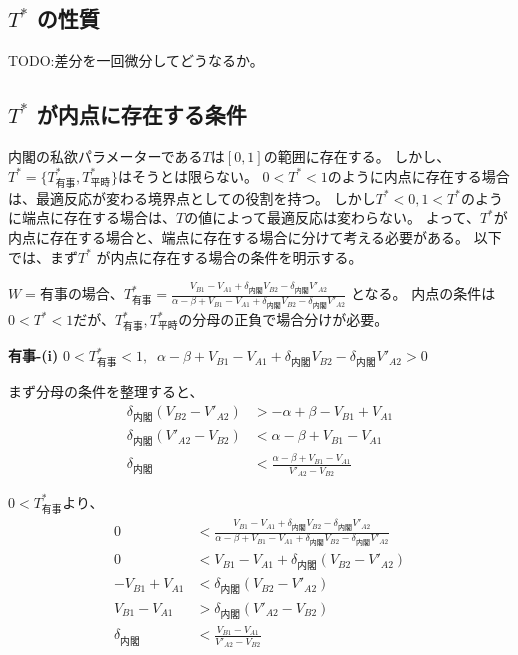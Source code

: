 \documentclass[main.tex]{subfiles}
\begin{document}
\subsection{$T^*$ の性質}

TODO:差分を一回微分してどうなるか。






\subsection{$T^*$ が内点に存在する条件}

内閣の私欲パラメーターである$T$は$[0,1]$の範囲に存在する。
しかし、$T^* = \lbrace T^*_{有事}, T^*_{平時} \rbrace$はそうとは限らない。
$0<T^*<1$のように内点に存在する場合は、最適反応が変わる境界点としての役割を持つ。
しかし$T^*<0,1<T^*$のように端点に存在する場合は、$T$の値によって最適反応は変わらない。
よって、$T^*$が内点に存在する場合と、端点に存在する場合に分けて考える必要がある。
以下では、まず$T^*$ が内点に存在する場合の条件を明示する。


$W=有事$の場合、$T^*_{有事} = \frac{ V_{B1} - V_{A1} +\delta_{内閣}V_{B2} - \delta_{内閣}V'_{A2} }{ \alpha-\beta + V_{B1}-V_{A1} + \delta_{内閣}V_{B2} - \delta_{内閣}V'_{A2} }$
となる。
内点の条件は$0<T^*<1$だが、$T^*_{有事}, T^*_{平時}$の分母の正負で場合分けが必要。

\bigskip
\noindent
\textbf{有事-(i)}\; $0<T^*_{有事}<1,\;\; \alpha-\beta + V_{B1}-V_{A1} + \delta_{内閣}V_{B2} - \delta_{内閣}V'_{A2} > 0$

まず分母の条件を整理すると、
\begin{align*}
    \delta_{内閣}(V_{B2} - V'_{A2}) &> -\alpha+\beta - V_{B1}+V_{A1} \\
    \delta_{内閣}(V'_{A2} - V_{B2}) &< \alpha-\beta + V_{B1}-V_{A1}\\
    \delta_{内閣} &< \frac{\alpha-\beta + V_{B1}-V_{A1}}{V'_{A2} - V_{B2}}
\end{align*}

$0<T^*_{有事}$より、
\begin{align*}
    0 &< \frac{ V_{B1} - V_{A1} +\delta_{内閣}V_{B2} - \delta_{内閣}V'_{A2} }{ \alpha-\beta + V_{B1}-V_{A1} + \delta_{内閣}V_{B2} - \delta_{内閣}V'_{A2} }\\
    0 &<  V_{B1} - V_{A1} +\delta_{内閣}(V_{B2} - V'_{A2})\\
    -V_{B1} + V_{A1} &< \delta_{内閣}(V_{B2} - V'_{A2})\\
    V_{B1} - V_{A1} &> \delta_{内閣}(V'_{A2} - V_{B2})\\
    \delta_{内閣} &< \frac{V_{B1} - V_{A1}}{V'_{A2} - V_{B2}}
\end{align*}
\end{document}
